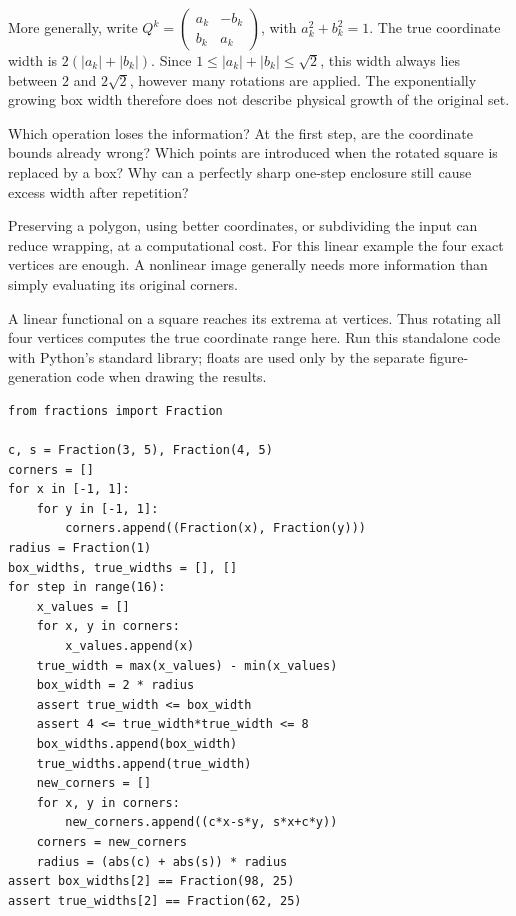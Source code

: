 More generally, write
$Q^k=\left(\begin{smallmatrix}a_k&-b_k\\b_k&a_k\end{smallmatrix}\right)$,
with $a_k^2+b_k^2=1$. The true coordinate width is
$2(|a_k|+|b_k|)$. Since $1\le |a_k|+|b_k|\le\sqrt2$, this width always
lies between $2$ and $2\sqrt2$, however many rotations are applied.
The exponentially growing box width therefore does not describe physical
growth of the original set.

\begin{question}{Which operation loses the information?}
At the first step, are the coordinate bounds already wrong? Which points
are introduced when the rotated square is replaced by a box? Why can a
perfectly sharp one-step enclosure still cause excess width after repetition?
\end{question}

Preserving a polygon, using better coordinates, or subdividing the input
can reduce wrapping, at a computational cost. For this linear example the
four exact vertices are enough. A nonlinear image generally needs more
information than simply evaluating its original corners.

\newpage
{}
A linear functional on a square reaches its extrema at vertices. Thus
rotating all four vertices computes the true coordinate range here. Run
this standalone code with Python's standard library; floats are used only
by the separate figure-generation code when drawing the results.
\begin{lstlisting}
from fractions import Fraction

c, s = Fraction(3, 5), Fraction(4, 5)
corners = []
for x in [-1, 1]:
    for y in [-1, 1]:
        corners.append((Fraction(x), Fraction(y)))
radius = Fraction(1)
box_widths, true_widths = [], []
for step in range(16):
    x_values = []
    for x, y in corners:
        x_values.append(x)
    true_width = max(x_values) - min(x_values)
    box_width = 2 * radius
    assert true_width <= box_width
    assert 4 <= true_width*true_width <= 8
    box_widths.append(box_width)
    true_widths.append(true_width)
    new_corners = []
    for x, y in corners:
        new_corners.append((c*x-s*y, s*x+c*y))
    corners = new_corners
    radius = (abs(c) + abs(s)) * radius
assert box_widths[2] == Fraction(98, 25)
assert true_widths[2] == Fraction(62, 25)
\end{lstlisting}

